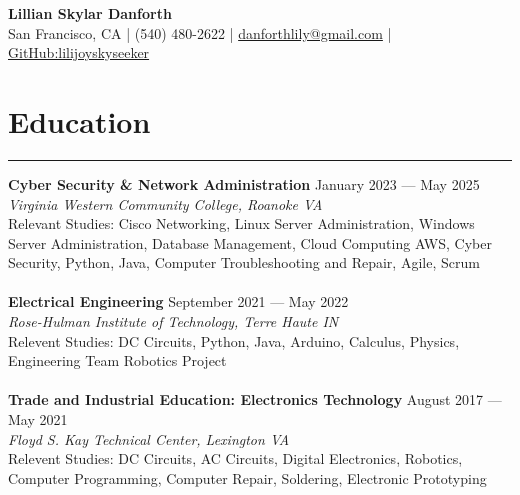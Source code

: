 \documentclass[a4paper,11pt]{article}
\begin{document}
\begin{center}
    {\LARGE \textbf{Lillian Skylar Danforth}} \\
    \vspace{0.2cm}
    \small
    San Francisco, CA | (540) 480-2622 | \href{mailto:danforthlily@gmail.com}{danforthlily@gmail.com} | \href{https://github.com/lilijoyskyseeker}{GitHub:lilijoyskyseeker} \\
    \vspace{-0.3cm}
\end{center}
    
\section*{\hspace*{1em} Education}
\vspace{-0.2cm}
\hrule
\vspace{0.2cm}
\textbf{\hspace*{1em}Cyber Security \& Network Administration}
\hfill January 2023 — May 2025 \\
\textit{Virginia Western Community College, Roanoke VA} \\
Relevant Studies: Cisco Networking, Linux Server Administration, Windows Server Administration, Database Management, Cloud Computing AWS, Cyber Security, Python, Java, Computer Troubleshooting and Repair, Agile, Scrum \\
\vspace{-0.3cm} \\
\textbf{\hspace*{1em}Electrical Engineering}
\hfill September 2021 — May 2022 \\
\textit{Rose-Hulman Institute of Technology, Terre Haute IN} \\
Relevent Studies: DC Circuits, Python, Java, Arduino, Calculus, Physics, Engineering Team Robotics Project \\
\vspace{-0.3cm} \\
\textbf{\hspace*{1em}Trade and Industrial Education: Electronics Technology}
\hfill August 2017 — May 2021 \\
\textit{Floyd S. Kay Technical Center, Lexington VA} \\
Relevent Studies: DC Circuits, AC Circuits, Digital Electronics, Robotics, Computer Programming, Computer Repair, Soldering, Electronic Prototyping\\
\end{document}
